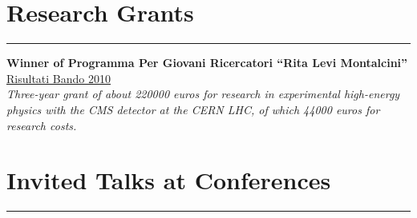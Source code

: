 \documentclass[10pt, a4paper]{article}
\newcommand{\years}[1]{\marginnote{\hskip-0.2in{\scriptsize #1}}}
\begin{document}
\clearpage

\section*{Research Grants}
\vspace{-5pt}
\hrule
\vspace{10pt}
\years{08/2013}\textbf{Winner of Programma Per Giovani
  Ricercatori ``Rita Levi Montalcini''} \\ 
 \href{http://cervelli.cineca.it/ProgGiovRic/dm050813_683.pdf}{Risultati Bando 2010} \\
\emph{Three-year grant of about 220000 euros for research in experimental high-energy
  physics with the CMS detector at the CERN LHC, of which 44000 euros for research costs.}

\section*{Invited Talks at Conferences}
\vspace{-5pt}
\hrule
\vspace{10pt}
\noindent
\end{document}
